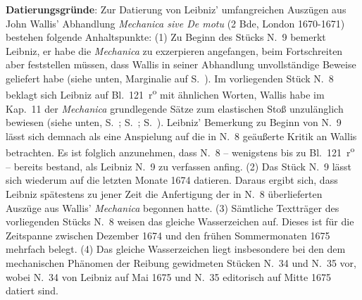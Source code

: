 \begin{ledgroup}
\footnotesize
\pstart
\noindent
\footnotesize{\textbf{Datierungsgr\"{u}nde}: Zur Datierung von Leibniz' umfangreichen Auszügen aus John Wallis' Abhandlung \textit{Mechanica sive De motu} (2 Bde, London 1670-1671)\cite{00301}
bestehen folgende Anhaltspunkte:%
\newline\hspace*{6mm}%
(1) Zu Beginn des Stücks N.~9 %
bemerkt Leibniz, er habe die \textit{Mechanica} zu exzerpieren angefangen, beim Fortschreiten aber feststellen müssen,
dass Wallis in seiner Abhandlung unvollständige Beweise geliefert habe
(siehe unten, Marginalie auf S.~\pageref{LH35,14,02_114r_ref-1}).
Im vorliegenden Stück N.~8 %
beklagt sich Leibniz auf Bl.~121~r\textsuperscript{o} mit ähnlichen Worten,
Wallis habe im Kap.~11 der \textit{Mechanica} grundlegende Sätze zum elastischen Stoß unzulänglich bewiesen
(siehe unten, S.~;
S.~;
S.~).
Leibniz' Bemerkung zu Beginn von N.~9 %
lässt sich demnach als eine Anspielung auf die in N.~8 %
geäußerte Kritik an Wallis betrachten.
Es ist folglich anzunehmen, dass N.~8 %
-- wenigstens bis zu Bl.~121~r\textsuperscript{o} -- bereits bestand,
als Leibniz N.~9 %
zu verfassen anfing.%
\newline\hspace*{6mm}%
(2) Das Stück N.~9 %
lässt sich wiederum auf die letzten Monate 1674 datieren.
Daraus ergibt sich, dass Leibniz spätestens zu jener Zeit die Anfertigung der in N.~8 %
überlieferten Auszüge aus Wallis' \textit{Mechanica} begonnen hatte.%
\newline\hspace*{6mm}%
(3) Sämtliche Textträger des vorliegenden Stücks N.~8 %
weisen das gleiche Wasserzeichen auf.
Dieses ist für die Zeitspanne zwischen Dezember 1674 und den frühen Sommermonaten 1675 mehrfach belegt.%
\newline\hspace*{6mm}%
(4) Das gleiche Wasserzeichen liegt insbesondere bei den dem mechanischen Phänomen der Reibung gewidmeten Stücken N.~34 und N.~35 vor,
wobei N.~34 von Leibniz auf Mai 1675 und N.~35 edito\-risch auf Mitte 1675 datiert sind.
}
\end{ledgroup}
